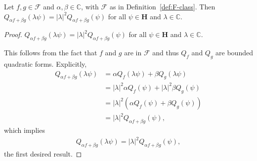 \begin{proposition}
    \label{prpstn:F-homogeneous}
    \leanok
    Let $f,g \in \mathcal{F}$ and $\alpha,\beta \in \mathbb{C}$, with $\mathcal{F}$ as in Definition~\ref{def:F-class}. Then $Q_{\alpha f + \beta g}(\lambda\psi) = \lvert \lambda \rvert^2 Q_{\alpha f + \beta g}(\psi)$ for all $\psi \in \mathbf{H}$ and $\lambda \in \mathbb{C}$.
\end{proposition}
\begin{proof}
    \leanok
$Q_{\alpha f + \beta g}(\lambda\psi) = \lvert\lambda \rvert^2 Q_{\alpha f + \beta g}(\psi)$ for all $\psi \in \mathbf{H}$ and $\lambda \in \mathbb{C}$.

This follows from the fact that $f$ and $g$ are in $\mathcal{F}$ and thus $Q_f$ and $Q_g$ are bounded quadratic forms. Explicitly,
\begin{align}
    Q_{\alpha f + \beta g}(\lambda\psi) &= \alpha Q_f(\lambda\psi) + \beta Q_g(\lambda\psi) \\
                                        &= \lvert \lambda \rvert^2 \alpha Q_f(\psi) + \lvert \lambda \rvert^2 \beta Q_g(\psi) \\
                                        &= \lvert \lambda \rvert^2 \left( \alpha Q_f(\psi) + \beta Q_g(\psi) \right) \\
                                        &= \lvert \lambda \rvert^2 Q_{\alpha f + \beta g}(\psi),
\end{align}
which implies
\begin{align}
    Q_{\alpha f + \beta g}(\lambda\psi) = \lvert\lambda \rvert^2 Q_{\alpha f + \beta g}(\psi),
\end{align}
the first desired result.
\end{proof}

